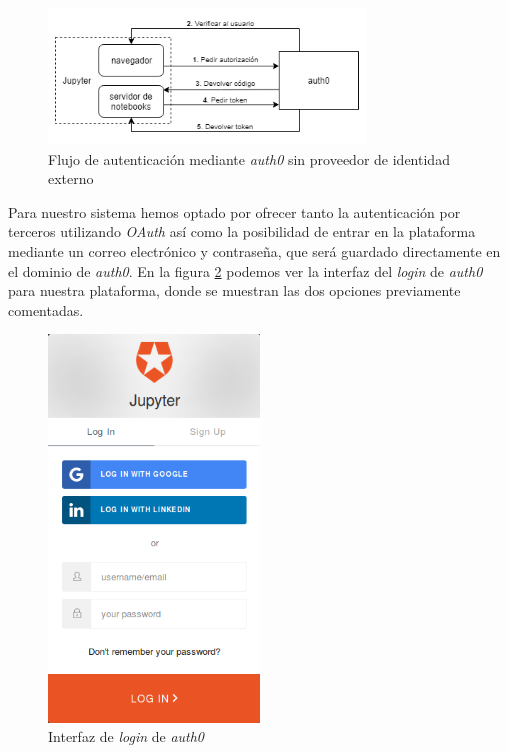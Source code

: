 \documentclass[11pt,spanish,listoffigures]{tfgetsinf}
\begin{document}
\begin{figure}[h]
	\centering
  	\includegraphics[width=0.75\textwidth]{auth0-flow2.png}
  	\caption{Flujo de autenticación mediante \textit{auth0} sin proveedor de identidad externo}
  	\label{fig:auth0-scheme-2}
\end{figure}

Para nuestro sistema hemos optado por ofrecer tanto la autenticación por terceros utilizando \textit{OAuth} así como la posibilidad de entrar en la plataforma mediante un correo electrónico y contraseña, que será guardado directamente en el dominio de \textit{auth0}. En la figura \ref{fig:login} podemos ver la interfaz del \textit{login} de \textit{auth0} para nuestra plataforma, donde se muestran las dos opciones previamente comentadas.

\begin{figure}[H]
	\centering
  	\includegraphics[width=0.5\textwidth]{login.png}
  	\caption{Interfaz de \textit{login} de \textit{auth0}}
  	\label{fig:login}
\end{figure}
\end{document}
